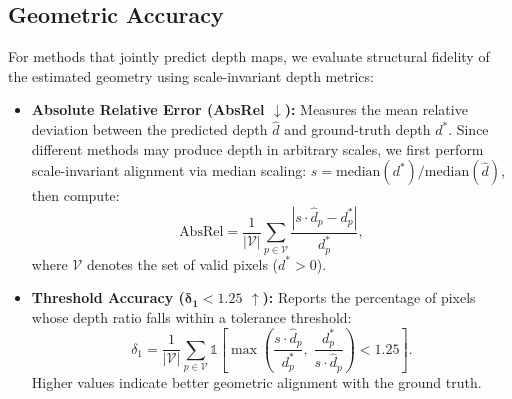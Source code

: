 \subsection{Geometric Accuracy}
For methods that jointly predict depth maps, we evaluate structural fidelity of the estimated geometry using scale-invariant depth metrics:
\begin{itemize}[labelsep=0.6em, leftmargin=1.2em,itemindent=0em]
\item \textbf{Absolute Relative Error (AbsRel $\downarrow$):} Measures the mean relative deviation between the predicted depth $\hat{d}$ and ground-truth depth $d^*$. Since different methods may produce depth in arbitrary scales, we first perform scale-invariant alignment via median scaling: $s = \text{median}(d^*) / \text{median}(\hat{d})$, then compute:
\begin{equation}
\text{AbsRel} = \frac{1}{|\mathcal{V}|} \sum_{p \in \mathcal{V}} \frac{|s \cdot \hat{d}_p - d^*_p|}{d^*_p},
\end{equation}
where $\mathcal{V}$ denotes the set of valid pixels ($d^* > 0$).
\item \textbf{Threshold Accuracy ($\boldsymbol{\delta_1 < 1.25}$ $\uparrow$):} Reports the percentage of pixels whose depth ratio falls within a tolerance threshold:
\begin{equation}
\delta_1 = \frac{1}{|\mathcal{V}|} \sum_{p \in \mathcal{V}} \mathbb{1}\left[\max\left(\frac{s \cdot \hat{d}_p}{d^*_p},\; \frac{d^*_p}{s \cdot \hat{d}_p}\right) < 1.25\right].
\end{equation}
Higher values indicate better geometric alignment with the ground truth.
\end{itemize}


